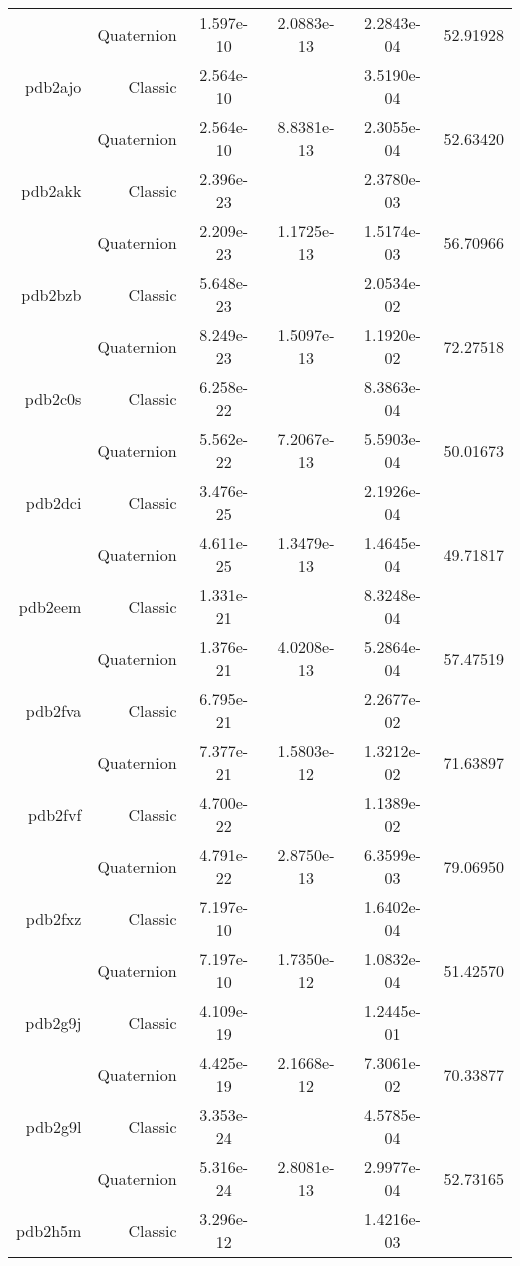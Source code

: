 \begin{xltabular}{\textwidth}{r|rS[table-format=1.3e+2]S[table-format=1.4e+2]S[table-format=1.4e+2]S[table-format=-1.5]}
& Quaternion & 1.597e-10 & 2.0883e-13 & 2.2843e-04 & 52.91928\\  \addlinespace
pdb2ajo & Classic & 2.564e-10 &  & 3.5190e-04 & \\
& Quaternion & 2.564e-10 & 8.8381e-13 & 2.3055e-04 & 52.63420\\  \addlinespace
pdb2akk & Classic & 2.396e-23 &  & 2.3780e-03 & \\
& Quaternion & 2.209e-23 & 1.1725e-13 & 1.5174e-03 & 56.70966\\  \addlinespace
pdb2bzb & Classic & 5.648e-23 &  & 2.0534e-02 & \\
& Quaternion & 8.249e-23 & 1.5097e-13 & 1.1920e-02 & 72.27518\\  \addlinespace
pdb2c0s & Classic & 6.258e-22 &  & 8.3863e-04 & \\
& Quaternion & 5.562e-22 & 7.2067e-13 & 5.5903e-04 & 50.01673\\  \addlinespace
pdb2dci & Classic & 3.476e-25 &  & 2.1926e-04 & \\
& Quaternion & 4.611e-25 & 1.3479e-13 & 1.4645e-04 & 49.71817\\  \addlinespace
pdb2eem & Classic & 1.331e-21 &  & 8.3248e-04 & \\
& Quaternion & 1.376e-21 & 4.0208e-13 & 5.2864e-04 & 57.47519\\  \addlinespace
pdb2fva & Classic & 6.795e-21 &  & 2.2677e-02 & \\
& Quaternion & 7.377e-21 & 1.5803e-12 & 1.3212e-02 & 71.63897\\  \addlinespace
pdb2fvf & Classic & 4.700e-22 &  & 1.1389e-02 & \\
& Quaternion & 4.791e-22 & 2.8750e-13 & 6.3599e-03 & 79.06950\\  \addlinespace
pdb2fxz & Classic & 7.197e-10 &  & 1.6402e-04 & \\
& Quaternion & 7.197e-10 & 1.7350e-12 & 1.0832e-04 & 51.42570\\  \addlinespace
pdb2g9j & Classic & 4.109e-19 &  & 1.2445e-01 & \\
& Quaternion & 4.425e-19 & 2.1668e-12 & 7.3061e-02 & 70.33877\\  \addlinespace
pdb2g9l & Classic & 3.353e-24 &  & 4.5785e-04 & \\
& Quaternion & 5.316e-24 & 2.8081e-13 & 2.9977e-04 & 52.73165\\  \addlinespace
pdb2h5m & Classic & 3.296e-12 &  & 1.4216e-03 & \\

\end{xltabular}
